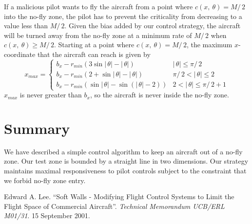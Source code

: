\documentclass[11pt]{article}
\begin{document}
If a malicious pilot wants to fly the aircraft from a point where 
$c(x,\ \theta) = M/\,2$ into the no-fly zone, the pilot has to prevent the
criticality from decreasing to a value less than $M/\,2$. Given the bias added
by our control strategy, the aircraft will be turned away from the no-fly zone
at a minimum rate of $M/\,2$ when $c(x,\ \theta) \geq M/\,2$. Starting at a
point where $c(x,\ \theta) = M/\,2$, the maximum $x$-coordinate that the
aircraft can reach is given by
\[x_{max} = 
\left\{ \begin{array}{ll}
b_{x} - r_{min}(3\sin\!|\,\theta| - |\,\theta|) & |\,\theta| \leq \pi/\,2
\\
b_{x} - r_{min}(2 + \sin\!|\,\theta| - |\,\theta|) & \pi/\,2 < |\,\theta| \leq 2
\\
b_{x} - r_{min}(\sin\!|\,\theta| - \sin(|\,\theta|-2)) & 2 < |\,\theta| \leq \pi/\,2 + 1
\end{array}
\right.
\]
$x_{max}$ is never greater than $b_x$, so the aircraft is never inside the
no-fly zone.


\section{Summary}

We have described a simple control algorithm to keep an aircraft out
of a no-fly zone.  Our test zone is bounded by a straight line in two
dimensions.  Our strategy maintains maximal responsiveness to pilot
controls subject to the constraint that we forbid no-fly zone entry.

\begin{thebibliography}{Lee 2001}

Edward A. Lee.  ``Soft Walls - Modifying Flight Control Systems to
Limit the Flight Space of Commercial Aircraft''.  \textit{Technical
Memorandum UCB/ERL M01/31}.  15 September 2001.

\end{thebibliography}
\end{document}
